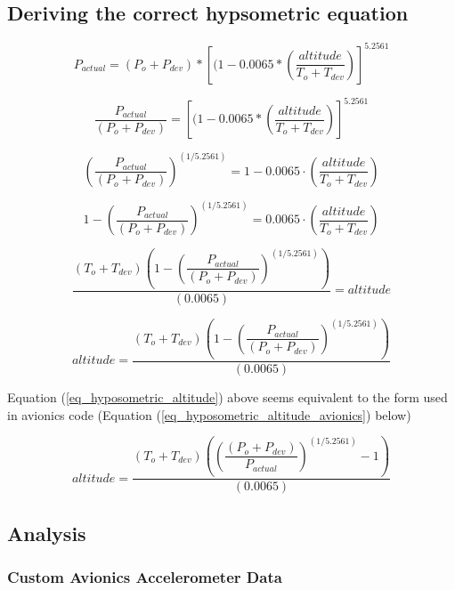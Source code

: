\documentclass[]{article}
\begin{document}
\subsection{Deriving the correct hypsometric
equation}\label{deriving-the-correct-hypsometric-equation}

\[ P_{actual} = (P_o + P_{dev}) * \left[(1-0.0065* \left( \dfrac{ altitude } { T_o + T_{dev} } \right) \right]^{5.2561} \]

\[ \dfrac{P_{actual}}{ (P_o + P_{dev})  } = \left[(1-0.0065* \left( \dfrac{ altitude } { T_o + T_{dev} } \right) \right]^{5.2561} \]

\[ 
\left( \dfrac{ P_{actual} }{ (P_o + P_{dev}) } \right)^{( 1/5.2561 )} 
= 
1-0.0065 \cdot \left( \dfrac{ altitude } { T_o + T_{dev} } \right) 
\]

\[ 
1 - \left( \dfrac{ P_{actual} }{ (P_o + P_{dev}) } \right)^{( 1/5.2561 )} 
= 
0.0065 \cdot \left( \dfrac{ altitude } { T_o + T_{dev} } \right) 
\]

\[ 
\dfrac{ \left( T_o + T_{dev} \right) \left( 1 - \left( \dfrac{ P_{actual} }{ (P_o + P_{dev}) } \right)^{( 1/5.2561 )} \right) } { \left( 0.0065 \right) }
= 
altitude 
\]

\begin{equation}
\label{eq_hyposometric_altitude}
altitude=
\dfrac{ \left( T_o + T_{dev} \right) \left( 1 - \left( \dfrac{ P_{actual} }{ (P_o + P_{dev}) } \right)^{( 1/5.2561 )} \right) } { \left( 0.0065 \right) }
\end{equation}

Equation (\ref{eq_hyposometric_altitude}) above seems equivalent to the
form used in avionics code (Equation
(\ref{eq_hyposometric_altitude_avionics}) below)

\begin{equation}
\label{eq_hyposometric_altitude_avionics}
altitude =
\dfrac{ \left( T_o + T_{dev} \right) \left( \left( \dfrac{ (P_o + P_{dev}) }{ P_{actual} } \right)^{( 1/5.2561 )}  - 1 \right) } { \left( 0.0065 \right) }
\end{equation}

\clearpage

\subsection{Analysis}\label{analysis}

\subsubsection{Custom Avionics Accelerometer
Data}\label{custom-avionics-accelerometer-data}
\end{document}
